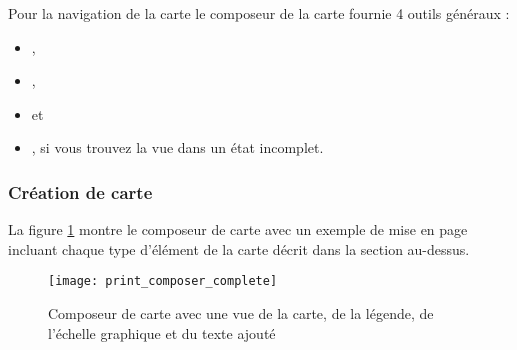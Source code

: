 {%
Pour la navigation de la carte le composeur de la carte fournie 4 outils
g\'en\'eraux :

\begin{itemize}
\item {},
\item {},
\item {} et
\item {}, si vous trouvez la vue dans
un \'etat incomplet.
\end{itemize}

\subsubsection{Cr\'eation de carte}

La figure \ref{fig:print_composer_complete} montre le composeur de carte avec
un exemple de mise en page incluant chaque type d'\'el\'ement de la carte d\'ecrit
dans la section au-dessus.

\begin{figure}[h]
   \begin{center}
\caption{Composeur de carte avec une vue de la carte, de la l\'egende, de
l'\'echelle graphique et du texte ajout\'e
\nixcaption}
   \label{fig:print_composer_complete}\smallskip
   \texttt{[image: print\_composer\_complete]}
\end{center}
\end{figure}

}

